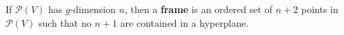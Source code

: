 If $\mathcal{P}(V)$ has $g$-dimension $n$, then a \textbf{frame} is an ordered set of $n + 2$ points in $\mathcal{P}(V)$ such that no $n + 1$ are contained in a hyperplane.
